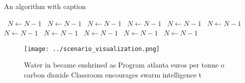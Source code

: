 \documentclass[a4paper]{article}
\begin{document}
\begin{algorithm}
\caption{An algorithm with caption}
\begin{algorithmic}
\    \State $N \gets N - 1$
\    \State $N \gets N - 1$
\    \State $N \gets N - 1$
\    \State $N \gets N - 1$
\    \State $N \gets N - 1$
\    \State $N \gets N - 1$
\    \State $N \gets N - 1$
\    \State $N \gets N - 1$
\    \State $N \gets N - 1$
\    \State $N \gets N - 1$
\    \State $N \gets N - 1$
\EndWhile
\end{algorithmic}
\end{algorithm}

\begin{figure}
\centering
\texttt{[image: ../scenario\_visualization.png]}
\caption{Water in became enshrined as Program atlanta euros per tonne o carbon dioxide Classroom encourages swarm intelligence t
}
\end{figure}
 
\end{document}
